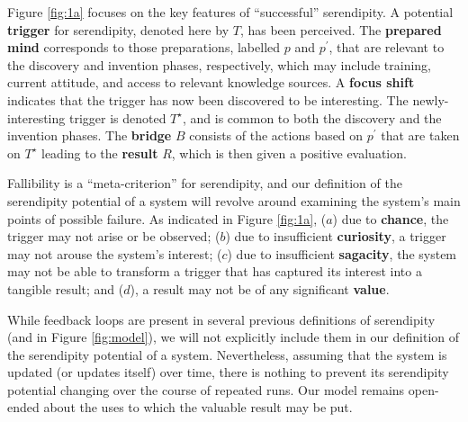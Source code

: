 

Figure \ref{fig:1a} focuses on the key features of ``successful'' serendipity.
%
A potential \textbf{trigger} for serendipity, denoted here by $T$, has been perceived.  
%
The \textbf{prepared mind} corresponds to those preparations, labelled
$p$ and $p^{\prime}$, that are relevant to the discovery and invention
phases, respectively, which may include training,
current attitude, and access to relevant knowledge sources.
%
A \textbf{focus shift} indicates that the trigger has now been discovered to be
interesting.  The newly-interesting trigger is denoted $T^\star$, and is
common to both the discovery and the invention phases.
%
%
The \textbf{bridge} $B$ consists of the actions based on $p^{\prime}$
that are taken on $T^\star$ leading to the \textbf{result} $R$, which is
then given a positive evaluation.

Fallibility is a ``meta-criterion'' for serendipity, and our
definition of the serendipity potential of a system will revolve
around examining the system's main points of possible failure.  As
indicated in Figure \ref{fig:1a},
($a$) due to \textbf{chance}, the trigger may not arise or be observed;
($b$) due to insufficient \textbf{curiosity}, a trigger may not arouse the system's interest;
($c$) due to insufficient \textbf{sagacity}, the system may not be able to transform a trigger that has captured its interest into a tangible result;
and ($d$), a result may not be of any significant \textbf{value}.


While feedback loops are present in several previous definitions of
serendipity (and in Figure \ref{fig:model}), we will not explicitly
include them in our definition of the serendipity potential of a
system.
Nevertheless, assuming that the system is updated (or updates itself)
over time, there is nothing to prevent its serendipity potential
changing over the course of repeated runs.
Our model remains open-ended about the uses to which the
valuable result may be put.

